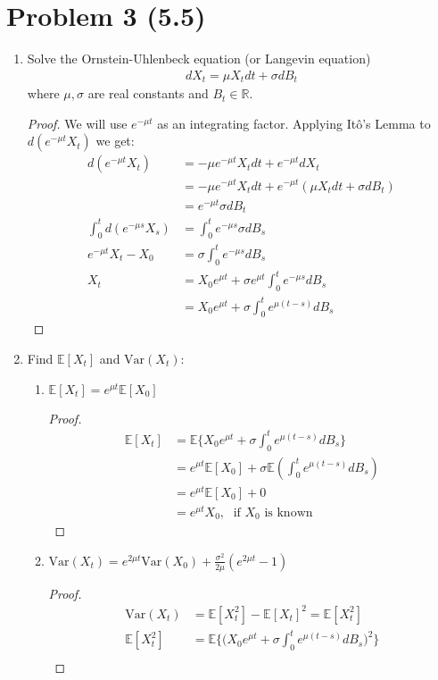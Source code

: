 \documentclass[11pt]{article}
\newcommand{\bbr}{\mathbb{R}}
\newcommand{\var}{\mrm{Var}}
\newcommand{\gs}{\sigma}
\newcommand{\mrm}{\mathrm}
\newcommand{\E}{\mathbb{E}}
\begin{document}
 \section*{Problem 3 (5.5)}
 \begin{enumerate}
\item Solve the Ornstein-Uhlenbeck equation (or Langevin equation) 
 \begin{align*}
 dX_t = \mu X_t dt + \gs d B_t
\end{align*}  where $\mu,\gs$ are real constants and $B_t \in \bbr$.
\begin{proof} We will use $e^{-\mu t}$ as an integrating factor.  Applying It\^o's Lemma to $d(e^{-\mu t} X_t)$ we get:
\begin{align*}
d(e^{-\mu t} X_t )&= -\mu e^{-\mu t} X_t dt + e^{-\mu t} dX_t\\
&=-\mu e^{-\mu t} X_t dt + e^{-\mu t} (\mu X_t dt + \gs dB_t)\\
&= e^{-\mu t} \gs dB_t\\
\int_0^t d(e^{-\mu s} X_s ) & = \int_0^t e^{-\mu s} \gs dB_s\\
e^{-\mu t}X_t -X_0 &= \gs \int_0^t e^{-\mu s} dB_s\\
X_t &= X_0e^{\mu t}+  \gs e^{\mu t} \int_0^t e^{-\mu s} dB_s\\
&=X_0e^{\mu t}+  \gs \int_0^t e^{\mu (t-s)} dB_s
\end{align*}
\end{proof}
 \item  Find $\E [X_t]$ and $\var(X_t)$:
\begin{enumerate}
\item $\E[ X_t] = e^{\mu t}\E[X_0]$
 \begin{proof}
\begin{align*}
\E[ X_t] &= \E \Big\{ X_0e^{\mu t}+  \gs \int_0^t e^{\mu (t-s)} dB_s \Big\}\\
&= e^{\mu t}\E[X_0]+ \gs \E (\int_0^t e^{\mu (t-s)} dB_s )\\
&= e^{\mu t}\E[X_0]+0\\
&= e^{\mu t} X_0, \; \text{ if $X_0$ is known}
\end{align*}
 \end{proof}
 \item $\var(X_t) = e^{2\mu t} \var(X_0) + \frac{\gs^2}{2 \mu}(e^{2 \mu t} -1)$
 \begin{proof}
 \begin{align*}
 \var(X_t) &= \E[X_t^2]-\E[X_t]^2 = \E[X_t^2]\\
 \E[X_t^2]&= \E \Big\{ \Big(X_0e^{\mu t} + \gs \int_0^t e^{\mu (t-s)} dB_s \Big)^2 \Big\}\\

\end{align*}
\end{proof}
\end{enumerate}
\end{enumerate}
\end{document}
